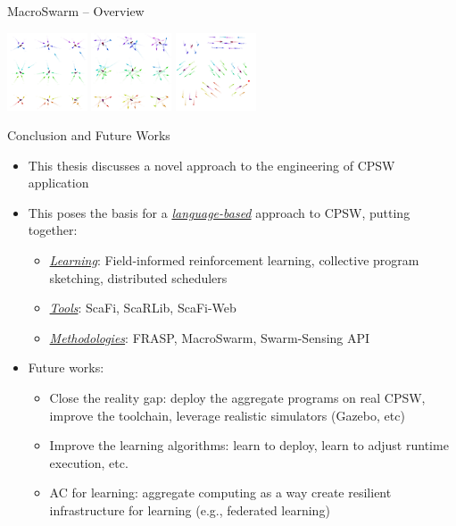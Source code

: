 \documentclass[presentation, 9pt,169]{beamer}\mode<presentation>{\usetheme{AMSBolognaFC}}
\begin{document}
\begin{frame}[fragile]{MacroSwarm -- Overview}
\begin{center}
  \includegraphics[height=2.3cm]{img/team-formation.png}
  \includegraphics[height=2.3cm]{img/circle-formation.png}
  \includegraphics[height=2.3cm]{img/explore.png}
\end{center}
\end{frame}
\begin{frame}{Conclusion and Future Works}
\begin{itemize}
  \item This thesis discusses a novel approach to the engineering of CPSW application
  \item This poses the basis for a \emph{\underline{language-based}} approach to CPSW, putting together:
  \begin{itemize}
    \item \emph{\underline{Learning}}: Field-informed reinforcement learning, collective program sketching, distributed schedulers
    \item \emph{\underline{Tools}}: ScaFi, ScaRLib, ScaFi-Web
    \item \emph{\underline{Methodologies}}: FRASP, MacroSwarm, Swarm-Sensing API
  \end{itemize}
  \item Future works:
  \begin{itemize}
    \item Close the reality gap: deploy the aggregate programs on real CPSW, improve the toolchain, leverage realistic simulators (Gazebo, etc)
    \item Improve the learning algorithms: learn to deploy, learn to adjust runtime execution, etc.
    \item AC for learning: aggregate computing as a way create resilient infrastructure for learning (e.g., federated learning)
  \end{itemize}
\end{itemize}
\end{frame}
\end{document}
